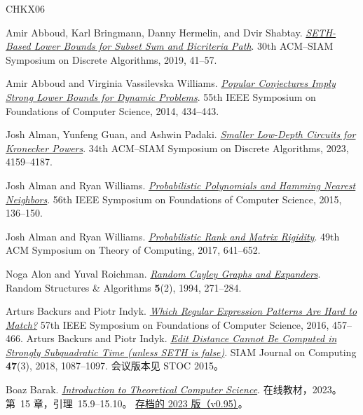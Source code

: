 \documentclass[11pt,reqno]{amsart}
\numberwithin{equation}{section}
\theoremstyle{definition}\newtheorem{definition}[theorem]{定义}
\theoremstyle{remark}\newtheorem{remark}[theorem]{注}
\begin{document}
\begin{thebibliography}{CHKX06}

Amir Abboud, Karl Bringmann, Danny Hermelin, and Dvir Shabtay.
\href{https://doi.org/10.1137/1.9781611975482.3}
{\emph{SETH-Based Lower Bounds for Subset Sum and Bicriteria Path}}.
30th ACM--SIAM Symposium on Discrete Algorithms, 2019, 41--57.

Amir Abboud and Virginia Vassilevska Williams.
\href{https://doi.org/10.1109/FOCS.2014.53}
{\emph{Popular Conjectures Imply Strong Lower Bounds for Dynamic Problems}}.
55th IEEE Symposium on Foundations of Computer Science, 2014, 434--443.

Josh Alman, Yunfeng Guan, and Ashwin Padaki.
\href{https://arxiv.org/abs/2211.05217}
{\emph{Smaller Low-Depth Circuits for Kronecker Powers}}.
34th ACM--SIAM Symposium on Discrete Algorithms, 2023, 4159--4187.

Josh Alman and Ryan Williams.
\href{https://arxiv.org/abs/1507.05106}
{\emph{Probabilistic Polynomials and Hamming Nearest Neighbors}}.
56th IEEE Symposium on Foundations of Computer Science, 2015, 136--150.

Josh Alman and Ryan Williams.
\href{https://arxiv.org/abs/1611.05558}
{\emph{Probabilistic Rank and Matrix Rigidity}}.
49th ACM Symposium on Theory of Computing, 2017, 641--652.

Noga Alon and Yuval Roichman.
\href{https://doi.org/10.1002/rsa.3240050203}
{\emph{Random Cayley Graphs and Expanders}}.
Random Structures \& Algorithms \textbf{5}(2), 1994, 271--284.

Arturs Backurs and Piotr Indyk.
\href{https://doi.org/10.1109/FOCS.2016.56}
{\emph{Which Regular Expression Patterns Are Hard to Match?}}
57th IEEE Symposium on Foundations of Computer Science, 2016, 457--466.
Arturs Backurs and Piotr Indyk.
\href{https://doi.org/10.1137/15M1053128}
{\emph{Edit Distance Cannot Be Computed in Strongly Subquadratic Time
(unless SETH is false)}}.
SIAM Journal on Computing \textbf{47}(3), 2018, 1087--1097.
会议版本见 STOC 2015。

Boaz Barak.
\href{https://introtcs.org/public/lec_13_Cook_Levin.html}
{\emph{Introduction to Theoretical Computer Science}}.
在线教材，2023。第~15 章，引理~15.9--15.10。
\href{https://github.com/boazbk/tcs/releases/tag/v0.95}{存档的 2023 版（v0.95）}。


\end{thebibliography}
\end{document}
